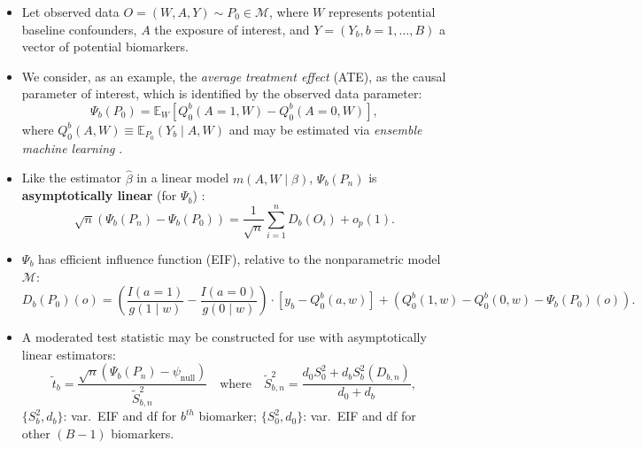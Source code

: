 \documentclass[landscape,a0paper,fontscale=0.285]{baposter} %
\newcommand{\compresslist}{ %
\setlength{\itemsep}{1pt}
\setlength{\parskip}{0pt}
\setlength{\parsep}{0pt}
}
\newcommand{\E}{\mathbb{E}}
\newcommand{\M}{\mathcal{M}}
\newcommand{\1}{\mathbbm{1}}
\begin{document}
\begin{poster}
{\begin{itemize}
  \itemsep0.50pt
  \item Let observed data $O = (W, A, Y) \sim P_0 \in \M$, where $W$ represents
      potential baseline confounders, $A$ the exposure of interest, and
      $Y = ({Y_b}, b = 1, \dots, B)$ a vector of potential biomarkers.
  \item We consider, as an example, the \textit{average treatment effect} (ATE),
      as the causal parameter of interest, which is identified by the observed
      data parameter:
      \begin{equation}\label{ate}
        \Psi_b(P_0) = \E_W[ Q_0^b(A = 1, W) - Q_0^b(A = 0, W)],
      \end{equation}
        where $Q_0^b(A, W) \equiv \E_{P_0}(Y_b \mid A, W)$ and may be estimated
        via \textit{ensemble machine learning}
        \cite{vdl2007super,breiman1996stacked,wolpert1992stacked}.
  \item Like the estimator $\hat{\beta}$ in a linear model $m(A,W \mid \beta)$,
      $\Psi_b(P_n)$ is \textbf{asymptotically linear} (for $\Psi_b$)
      \cite{vdl2011targeted}:
      \begin{equation}\label{asymp_lin}
        \sqrt{n} (\Psi_b(P_n) - \Psi_b(P_0)) = \frac{1}{\sqrt{n}} \sum_{i=1}^n
        D_b(O_i) + o_p(1).
      \end{equation}
  \item $\Psi_b$ has efficient influence function (EIF), relative to the
      nonparametric model $\M$:
      \begin{equation}\label{eif_ate}
        D_b(P_0)(o) = \left(\frac{I(a = 1)}{g(1 \mid w)} -
        \frac{I(a = 0)}{g(0 \mid w)}\right) \cdot \left[y_b - Q_0^b(a, w)\right]
        + \left(Q_0^b(1, w) - Q_0^b(0, w) - \Psi_b(P_0)(o)\right).
      \end{equation}
  \item A moderated test statistic \cite{smyth2004linear,hejazi2018+supervised}
      may be constructed for use with asymptotically linear estimators:
      \begin{equation}\label{mod_eif}
        \widetilde{t}_b = \frac{\sqrt{n}(\Psi_b(P_n) -
          \psi_{\text{null}})}{\widetilde{S}_{b,n}^2}
        \quad \text{where} \quad
        \widetilde{S}_{b,n}^2 = \frac{d_0S_0^2 + d_bS_b^2(D_{b,n})}{d_0 + d_b},
      \end{equation}
    $\{S_b^2, d_b\}$: var.~EIF and df for $b^{th}$ biomarker;
    $\{S_0^2, d_0\}$: var.~EIF and df for other $(B-1)$ biomarkers.
\end{itemize}

}

\end{poster}
\end{document}
